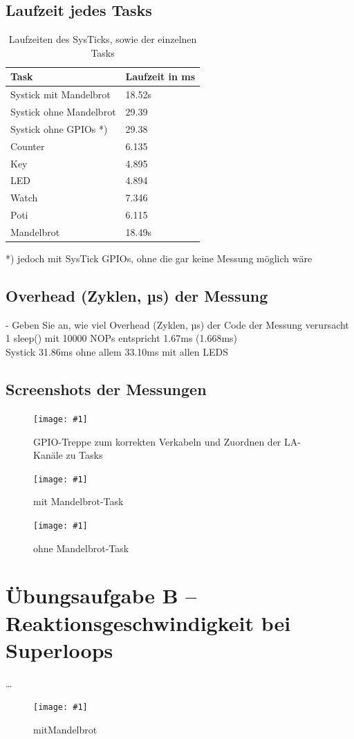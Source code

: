 \documentclass{article}
\newcommand{\bild}[3]{\begin{figure}[h!]		\begin{center}			\texttt{[image: \#1]}			\caption{#2}		\end{center}	\end{figure}}
\begin{document}
\subsection{Laufzeit jedes Tasks}
	\begin{table}[h!]
		\begin{center}		
			\begin{tabular}{ l | l }	 %
				Task & Laufzeit in ms \\ \hline
				Systick mit Mandelbrot	& 18.52s \\ \hline
				Systick ohne Mandelbrot	& 29.39 	\\ \hline
				Systick ohne GPIOs *)	& 29.38 \\ \hline
				Counter	& 6.135 \\ \hline
				Key& 4.895 \\ \hline
				LED	& 4.894 \\ \hline
				Watch	& 7.346 \\ \hline
				Poti	& 6.115 \\ \hline
				Mandelbrot	& 18.49s \\ %
			\end{tabular}
			\caption{Laufzeiten des SysTicks, sowie der einzelnen Tasks}
		\end{center}		
	\end{table}

		

	*) jedoch mit SysTick GPIOs, ohne die gar keine Messung möglich wäre

\subsection{Overhead (Zyklen, µs) der Messung}
-  Geben Sie an, wie viel Overhead (Zyklen, µs) der Code der Messung verursacht \\
	1 sleep() mit 10000 NOPs entspricht 1.67ms (1.668ms) \\
	Systick 31.86ms ohne allem
	33.10ms mit allen LEDS

	\subsection{Screenshots der Messungen }
\bild{tryGPIO}{GPIO-Treppe zum korrekten Verkabeln und Zuordnen der LA-Kanäle zu Tasks}{width=\textwidth}
\bild{02_mitMandelbrot}{mit Mandelbrot-Task}{width=\textwidth}
\bild{03_ohneMandelbrot_time}{ohne Mandelbrot-Task}{width=\textwidth}


\section{Übungsaufgabe B – Reaktionsgeschwindigkeit bei Superloops}
\ldots

\bild{RTO1_UE1_APUS}{mitMandelbrot}{width=\textwidth}
\end{document}

